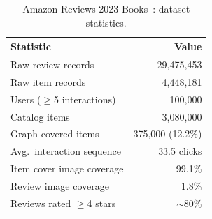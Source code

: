 \begin{table}[tbp]
\centering
\caption{Amazon Reviews 2023 Books~\cite{hou2024amazon}: dataset statistics.}
\label{tab:dataset}
\begin{tabular}{lr}
\toprule
\textbf{Statistic} & \textbf{Value} \\
\midrule
Raw review records            & 29{,}475{,}453    \\
Raw item records              & 4{,}448{,}181     \\
Users ($\geq$5 interactions)  & 100{,}000           \\
Catalog items                 & 3{,}080{,}000         \\
Graph-covered items           & 375{,}000 (12.2\%)  \\
Avg.\ interaction sequence    & 33.5 clicks       \\
Item cover image coverage     & 99.1\%            \\
Review image coverage         & 1.8\%             \\
Reviews rated $\geq$4 stars   & $\sim$80\%        \\
\bottomrule
\end{tabular}
\end{table}
